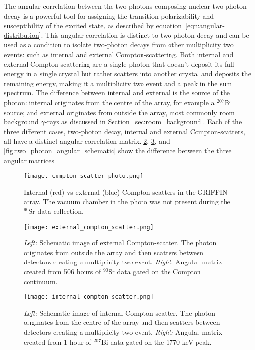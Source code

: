 \documentclass[cnatzke_thesis_proposal.tex]{subfiles}
\begin{document}
The angular correlation between the two photons composing nuclear two-photon decay is a powerful tool for assigning the transition polarizability and susceptibility of the excited state, as described by equation~\ref{eqn:angular-distribution}.
This angular correlation is distinct to two-photon decay and can be used as a condition to isolate two-photon decays from other multiplicity two events; such as internal and external Compton-scattering.
Both internal and external Compton-scattering are a single photon that doesn't deposit its full energy in a single crystal but rather scatters into another crystal and deposits the remaining energy, making it a multiplicity two event and a peak in the sum spectrum.
The difference between internal and external is the source of the photon: internal originates from the centre of the array, for example a $^{207}$Bi source; and external originates from outside the array, most commonly room background $\gamma$-rays as discussed in Section~\ref{sec:room_background}.
Each of the three different cases, two-photon decay, internal and external Compton-scatters, all have a distinct angular correlation matrix.
\ref{fig:external_compton_scatter_schematic}, \ref{fig:internal_compton_scatter_schematic}, and \ref{fig:two_photon_angular_schematic} show the difference between the three angular matrices

\begin{figure}[htbp]
    \centering
    \texttt{[image: compton\_scatter\_photo.png]}
    \caption{Internal (red) vs external (blue) Compton-scatters in the GRIFFIN array. The vacuum chamber in the photo was not present during the $^{90}$Sr data collection.}
    \label{fig:compton_scatter_griffin_photo}
\end{figure}

\begin{figure}[htbp]
  \centering
  \texttt{[image: external\_compton\_scatter.png]}
  \caption{
    \textit{Left:} Schematic image of external Compton-scatter. The photon originates from outside the array and then scatters between detectors creating a multiplicity two event.
    \textit{Right:} Angular matrix created from 506 hours of $^{90}$Sr data gated on the Compton continuum.
  }
  \label{fig:external_compton_scatter_schematic}
\end{figure}

\begin{figure}[htbp]
  \centering
  \texttt{[image: internal\_compton\_scatter.png]}
  \caption{
    \textit{Left:} Schematic image of internal Compton-scatter. The photon originates from the centre of the array and then scatters between detectors creating a multiplicity two event.
    \textit{Right:} Angular matrix created from 1 hour of $^{207}$Bi data gated on the 1770 keV peak.
  }
  \label{fig:internal_compton_scatter_schematic}
\end{figure}
\end{document}
